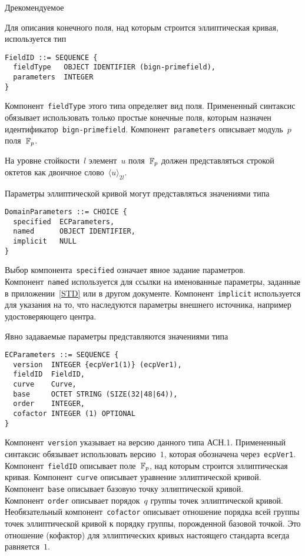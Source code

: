 \begin{appendix}{Д}{рекомендуемое}
\label{ASN.Field}

Для описания конечного поля, над которым строится эллиптическая кривая, 
используется тип
\begin{verbatim}
FieldID ::= SEQUENCE {
  fieldType   OBJECT IDENTIFIER (bign-primefield),
  parameters  INTEGER
}
\end{verbatim}

Компонент~\texttt{fieldType} этого типа определяет вид поля.
Примененный синтаксис обязывает использовать только простые 
конечные поля, которым назначен идентификатор~\texttt{bign-primefield}.
Компонент~\texttt{parameters} описывает модуль~$p$ поля~$\mathbb{F}_p$.

На уровне стойкости~$l$
элемент~$u$ поля~$\mathbb{F}_p$ должен представляться строкой 
октетов как двоичное слово~$\langle u\rangle_{2l}$.

\label{ASN.EC}

Параметры эллиптической кривой 
могут представляться значениями типа
\begin{verbatim}
DomainParameters ::= CHOICE {
  specified  ECParameters,
  named      OBJECT IDENTIFIER,
  implicit   NULL 
}
\end{verbatim}

Выбор компонента~\texttt{specified} означает
явное задание параметров. 
%
Компонент~\texttt{named} используется для
ссылки на именованные параметры, заданные в приложении~\ref{STD} или 
в другом документе.
%
Компонент~\texttt{implicit} используется 
для указания на то, что наследуются параметры внешнего источника,
например удостоверяющего центра.

Явно задаваемые параметры представляются значениями типа
\begin{verbatim}
ECParameters ::= SEQUENCE {
  version  INTEGER {ecpVer1(1)} (ecpVer1),
  fieldID  FieldID,
  curve    Curve,
  base     OCTET STRING (SIZE(32|48|64)),
  order    INTEGER,
  cofactor INTEGER (1) OPTIONAL
}
\end{verbatim}

Компонент~\texttt{version} указывает на версию данного типа АСН.1.
Примененный синтаксис обязывает использовать версию~$1$,
которая обозначена через~\texttt{ecpVer1}.
%
Компонент~\texttt{fieldID} описывает поле~$\mathbb{F}_p$, 
над которым строится эллиптическая кривая.
%
Компонент~\texttt{curve} описывает уравнение эллиптической кривой.
%
Компонент~\texttt{base} описывает базовую точку эллиптической кривой.
%
Компонент~\texttt{order} описывает порядок~$q$ 
группы точек эллиптической кривой.
%
Необязательный компонент~\texttt{cofactor} описывает отношение
порядка всей группы точек эллиптической кривой к порядку группы, 
порожденной базовой точкой.                        
Это отношение (кофактор) для эллиптических кривых
настоящего стандарта всегда равняется~$1$.


\end{appendix}
